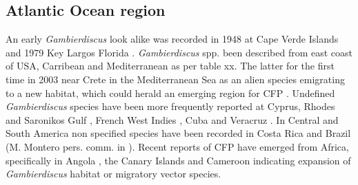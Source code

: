 \documentclass[12pt]{article}
\begin{document}
\subsection{Atlantic Ocean region}
An early \emph{Gambierdiscus} look alike was recorded in 1948 at Cape Verde Islands \cite{silva1956contribution} and 1979 Key Largos Florida \cite{taylor1979description}.
\emph{Gambierdiscus} spp. been described from east coast of USA, Carribean and Mediterranean as per table xx. The latter for the first time in 2003 near Crete in the Mediterranean Sea as an alien species emigrating to a new habitat, which could herald an emerging region for CFP \cite{aligizaki2008morphological,zenetos2009aquatic}.
Undefined \emph{Gambierdiscus} species have been more frequently reported at Cyprus, Rhodes and Saronikos Gulf \cite{aligizaki2009toxic,aligizaki2010diversity}, French West Indies \cite{lobel1988assessment}, Cuba \cite{delgado2006epiphytic} and Veracruz \cite{okolodkov2007seasonal}.
In Central and South America non specified species have been recorded in Costa Rica and Brazil (M. Montero pers. comm. in \cite{parsons2012gambierdiscus}).
Recent reports of CFP have emerged from Africa, specifically in Angola \cite{berdalet2012global}, the Canary Islands \cite{boada2010ciguatera} and Cameroon \cite{bienfang2008ciguatera} indicating expansion of \emph{Gambierdiscus} habitat or migratory vector species. %
\end{document}
